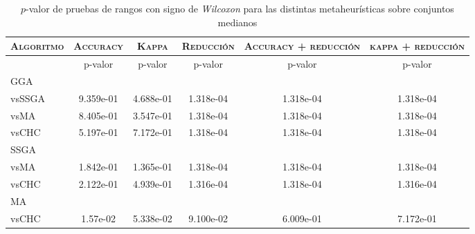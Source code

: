 \begin{table}[h!]
\centering
\begin{adjustbox}{max width =\textwidth}
\begin{tabular}{l c c c c c}
\hline
	\textsc{Algoritmo}
	& \multicolumn{1}{c}{\textsc{Accuracy}}
	& \multicolumn{1}{c}{\textsc{Kappa}}
	& \multicolumn{1}{c}{\textsc{Reducción}} 
	& \multicolumn{1}{c}{\textsc{Accuracy + reducción}} 
	& \multicolumn{1}{c}{\textsc{kappa + reducción}} \\
\hline
\hline

 & p-valor & p-valor & p-valor & p-valor & p-valor \\

GGA \\
vsSSGA & 9.359e-01 & 4.688e-01 & 1.318e-04 & 1.318e-04 & 1.318e-04 \\
vsMA & 8.405e-01 & 3.547e-01 & 1.318e-04 & 1.318e-04 & 1.318e-04 \\
vsCHC & 5.197e-01 & 7.172e-01 & 1.318e-04 & 1.318e-04 & 1.318e-04 \\

\hline

SSGA \\
vsMA & 1.842e-01 & 1.365e-01 & 1.318e-04 & 1.318e-04 & 1.318e-04 \\
vsCHC & 2.122e-01 & 4.939e-01 & 1.316e-04 & 1.318e-04 & 1.316e-04 \\

\hline

MA \\
vsCHC & 1.57e-02 & 5.338e-02 & 9.100e-02 & 6.009e-01 & 7.172e-01 \\ 

\hline


\end{tabular}
\end{adjustbox}
\caption[Pruebas de \emph{Wilcoxon} entre las metaheurísticas para conjuntos pequeños]{$p$-valor de pruebas de rangos con signo de \emph{Wilcoxon} para las distintas metaheurísticas sobre conjuntos medianos}
\label{wilcox-meta-med}
\end{table}

